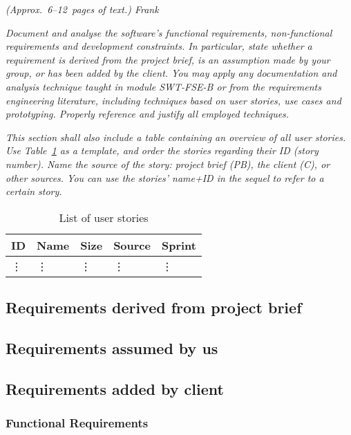 \emph{(Approx.~6--12~pages of text.) Frank}

\emph{Document and analyse the software's functional requirements, 
non-functional requirements and development constraints. In particular, state 
whether a requirement is derived from the project brief, is an assumption made 
by your group, or has been added by the client. You may apply any documentation 
and analysis technique taught in module SWT-FSE-B or from the 
requirements engineering literature, including techniques based on user stories, 
use cases and prototyping. Properly reference and justify all employed 
techniques.}

\emph{This section shall also include a table containing an overview of all user 
stories. Use Table~\ref{tab:user_stories} as a template, and order the stories 
regarding their ID (story number). Name the source of the story: project brief 
(PB), the client (C), or other sources. You can use the stories' name+ID in the 
sequel to refer to a certain story.}

\begin{table}[!h]
  \caption{List of user stories}
  \centering
  \begin{tabular}{l||l|l|l|l|}
    ID & Name & Size &  Source & Sprint\\
    \hline
    \vdots&\vdots&\vdots&\vdots&\vdots\\
  \end{tabular}
  \label{tab:user_stories}
\end{table}

\subsection{Requirements derived from project brief}

\subsection{Requirements assumed by us}

\subsection{Requirements added by client}
\subsubsection{Functional Requirements}

